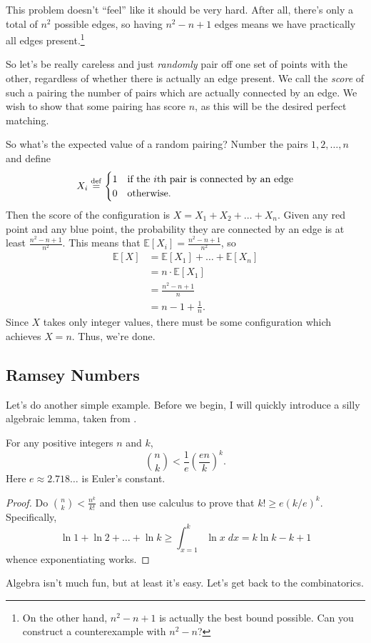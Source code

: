 \documentclass[11pt]{scrartcl}
\newcommand\EE{\mathbb E}
\begin{document}
This problem doesn't ``feel'' like it should be very hard.
After all, there's only a total of $n^2$ possible edges,
so having $n^2-n+1$ edges means we have practically all edges present.\footnote{On the other hand, $n^2-n+1$ is actually the best bound possible. Can you construct a counterexample with $n^2-n$?}

So let's be really careless and just \emph{randomly} pair off one set of points with the other,
regardless of whether there is actually an edge present.
We call the \emph{score} of such a pairing the number of pairs which are actually connected by an edge.
We wish to show that some pairing has score $n$, as this will be the desired perfect matching.

So what's the expected value of a random pairing?
Number the pairs $1, 2, \dots, n$ and define
\[ 
	X_i \overset{\mathrm{def}}{=}
	\begin{cases}
		1 & \text{if the $i$th pair is connected by an edge} \\
		0 & \text{otherwise}.
	\end{cases}
\]
Then the score of the configuration is $X = X_1 + X_2 + \dots + X_n$.
Given any red point and any blue point, the probability they are connected by an edge
is at least $\frac{n^2-n+1}{n^2}$.
This means that $\EE[X_i] = \frac{n^2-n+1}{n^2}$, so
\begin{align*}
	\EE[X] &= \EE[X_1] + \dots + \EE[X_n] \\
	&= n \cdot \EE[X_1] \\
	&= \frac{n^2-n+1}{n} \\
	&= n-1 + \frac 1n.
\end{align*}
Since $X$ takes only integer values, there must be some configuration which achieves $X=n$.
Thus, we're done.

\subsection{Ramsey Numbers}
Let's do another simple example. Before we begin, I will quickly introduce a silly algebraic lemma,
taken from \cite[page 30]{holden}.
\begin{lemma}
	For any positive integers $n$ and $k$, 
	\[ \binom nk < \frac 1e \left( \frac{en}{k} \right)^k. \]
	Here $e \approx 2.718\dots$ is Euler's constant.
	\label{lem:binom_bound}
\end{lemma}
\begin{proof}
	Do $\binom nk < \frac{n^k}{k!}$ and then use calculus to prove that
	$k! \ge e(k/e)^k$. Specifically, 
	\[ \ln 1 + \ln 2 + \dots + \ln k \ge \int_{x=1}^k \ln x \; dx = k \ln k - k + 1 \]
	whence exponentiating works.
\end{proof}
Algebra isn't much fun, but at least it's easy. Let's get back to the combinatorics.
\end{document}
